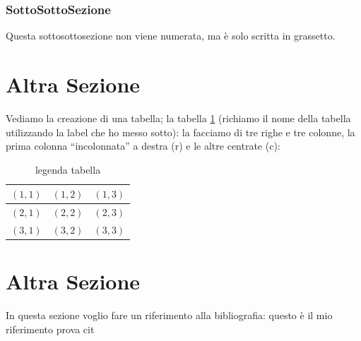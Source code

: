 \documentclass[12pt,a4paper,openright,twoside]{report}
\begin{document}
\subsubsection{SottoSottoSezione}Questa sottosottosezione non viene
numerata, ma \`e solo scritta in grassetto.


\section{Altra Sezione} %
Vediamo la creazione di una tabella; la tabella \ref{tab:uno}
(richiamo il nome della tabella utilizzando la label che ho messo sotto):
la facciamo di tre righe e tre colonne, la prima colonna
``incolonnata'' a destra (r) e le altre centrate (c):\\
\begin{table}[h] %
\begin{center} %
\begin{tabular}{r|c|c} %
\hline \hline                           %
$(1,1)$ & $(1,2)$ & $(1,3)$\\ %
\hline                                  %
$(2,1)$ & $(2,2)$ & $(2,3)$\\ %
\hline                                  %
$(3,1)$ & $(3,2)$ & $(3,3)$\\
\hline \hline                           %
\end{tabular}
\caption[legenda elenco tabelle]{legenda tabella}\label{tab:uno}
\end{center}
\end{table}


\section{Altra Sezione}\label{sec:prova}%
In questa sezione voglio fare un riferimento alla bibliografia: questo \`e il mio riferimento 
prova cit \cite{enisa_threat_landscape}

\clearpage{\pagestyle{empty}\cleardoublepage}



\end{document}
